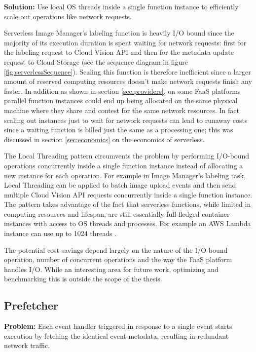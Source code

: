 
\textbf{Solution:} Use local OS threads inside a single function instance to efficiently scale out operations like network requests.

Serverless Image Manager's labeling function is heavily I/O bound since the majority of its execution duration is spent waiting for network requests: first for the labeling request to Cloud Vision API and then for the metadata update request to Cloud Storage (see the sequence diagram in figure \ref{fig:serverlessSequence}). Scaling this function is therefore inefficient since a larger amount of reserved computing resources doesn't make network requests finish any faster. In addition as shown in section \ref{sec:providers}, on some FaaS platforms parallel function instances could end up being allocated on the same physical machine where they share and contest for the same network resources. In fact scaling out instances just to wait for network requests can lead to runaway costs since a waiting function is billed just the same as a processing one; this was discussed in section \ref{sec:economics} on the economics of serverless.

The Local Threading pattern circumvents the problem by performing I/O-bound operations concurrently inside a single function instance instead of allocating a new instance for each operation. For example in Image Manager's labeling task, Local Threading can be applied to batch image upload events and then send multiple Cloud Vision API requests concurrently inside a single function instance. The pattern takes advantage of the fact that serverless functions, while limited in computing resources and lifespan, are still essentially full-fledged container instances with access to OS threads and processes. For example an AWS Lambda instance can use up to 1024 threads \parencite{awslambda0218}.

The potential cost savings depend largely on the nature of the I/O-bound operation, number of concurrent operations and the way the FaaS platform handles I/O. While an interesting area for future work, optimizing and benchmarking this is outside the scope of the thesis.

\subsection{Prefetcher} \label{subsec:prefetcher}

\textbf{Problem:} Each event handler triggered in response to a single event starts execution by fetching the identical event metadata, resulting in redundant network traffic.

